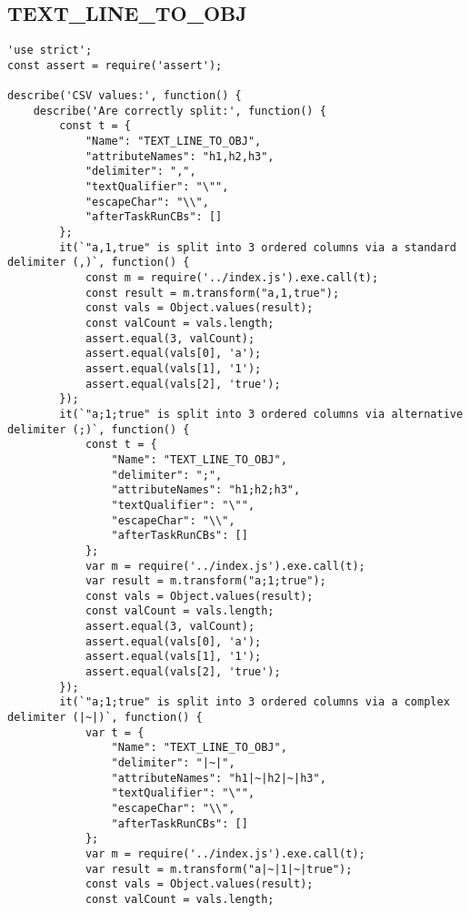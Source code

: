 \subsection{TEXT\_LINE\_TO\_OBJ}
\label{TEXT_LINE_TO_OBJ-tests}
\begin{verbatim}
'use strict';
const assert = require('assert');

describe('CSV values:', function() {
    describe('Are correctly split:', function() {
        const t = {
            "Name": "TEXT_LINE_TO_OBJ",
            "attributeNames": "h1,h2,h3",
            "delimiter": ",",
            "textQualifier": "\"",
            "escapeChar": "\\",
            "afterTaskRunCBs": []
        };
        it(`"a,1,true" is split into 3 ordered columns via a standard delimiter (,)`, function() {
            const m = require('../index.js').exe.call(t);
            const result = m.transform("a,1,true");
            const vals = Object.values(result);
            const valCount = vals.length;
            assert.equal(3, valCount);
            assert.equal(vals[0], 'a');
            assert.equal(vals[1], '1');
            assert.equal(vals[2], 'true');
        });
        it(`"a;1;true" is split into 3 ordered columns via alternative delimiter (;)`, function() {
            const t = {
                "Name": "TEXT_LINE_TO_OBJ",
                "delimiter": ";",
                "attributeNames": "h1;h2;h3",
                "textQualifier": "\"",
                "escapeChar": "\\",
                "afterTaskRunCBs": []
            };
            var m = require('../index.js').exe.call(t);
            var result = m.transform("a;1;true");
            const vals = Object.values(result);
            const valCount = vals.length;
            assert.equal(3, valCount);
            assert.equal(vals[0], 'a');
            assert.equal(vals[1], '1');
            assert.equal(vals[2], 'true');
        });
        it(`"a;1;true" is split into 3 ordered columns via a complex delimiter (|~|)`, function() {
            var t = {
                "Name": "TEXT_LINE_TO_OBJ",
                "delimiter": "|~|",
                "attributeNames": "h1|~|h2|~|h3",
                "textQualifier": "\"",
                "escapeChar": "\\",
                "afterTaskRunCBs": []
            };
            var m = require('../index.js').exe.call(t);
            var result = m.transform("a|~|1|~|true");
            const vals = Object.values(result);
            const valCount = vals.length;

\end{verbatim}
